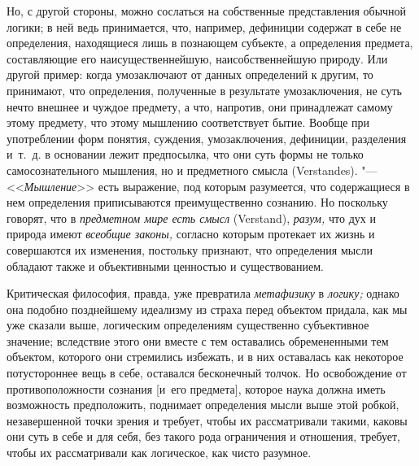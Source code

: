 Но, с другой стороны, можно сослаться на собственные представления обычной
логики; в ней ведь принимается, что, например, дефиниции содержат в себе не
определения, находящиеся лишь в познающем субъекте, а определения предмета,
составляющие его наисущественнейшую, наисобственнейшую природу. Или другой
пример: когда умозаключают от данных определений к другим, то принимают,
что определения, полученные в результате умозаключения, не суть нечто
внешнее и чуждое предмету, а что, напротив, они принадлежат самому этому
предмету, что этому мышлению соответствует бытие. Вообще при употреблении
форм понятия, суждения, умозаключения, дефиниции, разделения и~т.~д. в
основании лежит предпосылка, что они суть формы не только самосознательного
мышления, но и предметного смысла (Verstandes). "---
<<{\em Мышление}>> есть выражение, под которым
разумеется, что содержащиеся в нем определения приписываются
преимущественно сознанию. Но поскольку говорят, что в
{\em предметном мире есть смысл} (Verstand),
{\em разум,} что дух и природа имеют
{\em всеобщие законы,} согласно которым протекает их
жизнь и совершаются их изменения, постольку признают, что определения мысли
обладают также и объективными ценностью и существованием.

Критическая философия, правда, уже превратила
{\em метафизику} в {\em логику;}
однако она подобно позднейшему
идеализму
из страха перед объектом придала, как мы уже сказали выше, логическим
определениям существенно субъективное значение; вследствие этого они вместе
с тем оставались обремененными тем объектом, которого они стремились
избежать, и в них оставалась как некоторое потустороннее вещь в себе,
оставался бесконечный толчок. Но освобождение от противоположности сознания
[и~его предмета], которое наука должна иметь возможность предположить,
поднимает определения мысли выше этой робкой, незавершенной точки зрения и
требует, чтобы их рассматривали такими, каковы они суть в себе и для себя,
без такого рода ограничения и отношения, требует, чтобы их рассматривали
как логическое, как чисто разумное.

